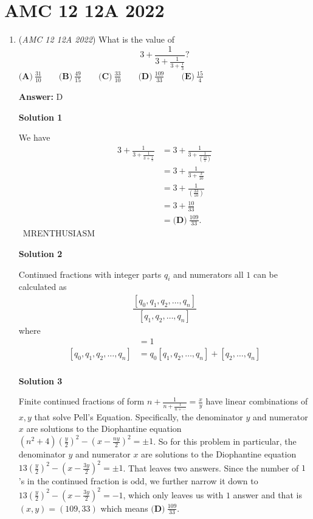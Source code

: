 \section{AMC 12 12A 2022}
        \begin{enumerate}
        	\item (\textit{AMC 12 12A 2022}) What is the value of 
 \[3+\frac{1}{3+\frac{1}{3+\frac13}}?\]
$\textbf{(A)}\ \frac{31}{10}\qquad\textbf{(B)}\ \frac{49}{15}\qquad\textbf{(C)}\ \frac{33}{10}\qquad\textbf{(D)}\ \frac{109}{33}\qquad\textbf{(E)}\ \frac{15}{4}$

 \textbf{Answer: }D



\textbf{Solution 1}

We have 
 \begin{align*} 3+\frac{1}{3+\frac{1}{3+\frac13}} &= 3+\frac{1}{3+\frac{1}{\left(\frac{10}{3}\right)}} \\ &= 3+\frac{1}{3+\frac{3}{10}} \\ &= 3+\frac{1}{\left(\frac{33}{10}\right)} \\ &= 3+\frac{10}{33} \\ &= \boxed{\textbf{(D)}\ \frac{109}{33}}. \end{align*}
~MRENTHUSIASM

 



\textbf{Solution 2}

Continued fractions with integer parts $q_i$ and numerators all $1$ can be calculated as 
 \begin{align*} \dfrac{[q_0,q_1,q_2,\ldots,q_n]}{[q_1,q_2,\ldots,q_n]} \end{align*}
where
 \begin{align*} []&=1 \\ [q_0,q_1,q_2,\ldots,q_n]&=q_0[q_1,q_2,\ldots,q_n]+[q_2,\ldots,q_n]\\ \end{align*}





\textbf{Solution 3}

Finite continued fractions of form $n+\frac{1}{n+\frac{1}{n+\cdots}}=\frac{x}{y}$ have linear combinations of $x, y$ that solve Pell's Equation. Specifically, the denominator $y$ and numerator $x$ are solutions to the Diophantine equation $(n^2+4)\left(\frac{y}{2}\right)^2-\left(x-\frac{ny}{2}\right)^2=\pm{1}$. So for this problem in particular, the denominator $y$ and numerator $x$ are solutions to the Diophantine equation $13\left(\frac{y}{2}\right)^2-\left(x-\frac{3y}{2}\right)^2=\pm{1}$. That leaves two answers. Since the number of $1$'s in the continued fraction is odd, we further narrow it down to $13\left(\frac{y}{2}\right)^2-\left(x-\frac{3y}{2}\right)^2=-1$, which only leaves us with $1$ answer and that is $(x,y)=(109,33)$ which means $\boxed{\textbf{(D)}\ \frac{109}{33}}$. 


\end{enumerate}

